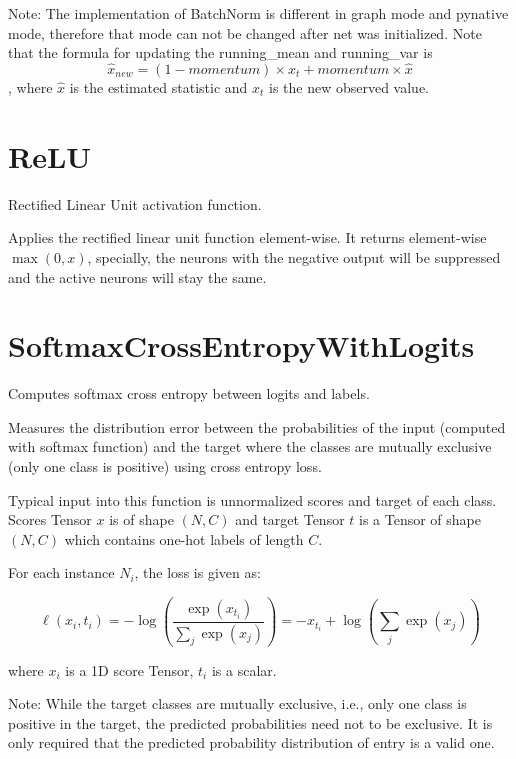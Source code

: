 \documentclass{article}
\begin{document}
    Note:
    The implementation of BatchNorm is different in graph mode and pynative mode, therefore that mode can not be
    changed after net was initialized.
    Note that the formula for updating the running\_mean and running\_var is
    $$\hat{x}_ {new} = (1 - momentum) \times x_t + momentum \times \hat{x}$$,
    where $\hat{x}$ is the estimated statistic and $x_t$ is the new observed value.


    \section{ReLU}
    Rectified Linear Unit activation function.

    Applies the rectified linear unit function element-wise. It returns
    element-wise $\max(0, x)$, specially, the neurons with the negative output
    will be suppressed and the active neurons will stay the same.


    \section{SoftmaxCrossEntropyWithLogits}
    Computes softmax cross entropy between logits and labels.

    Measures the distribution error between the probabilities of the input (computed with softmax function) and the
    target where the classes are mutually exclusive (only one class is positive) using cross entropy loss.

    Typical input into this function is unnormalized scores and target of each class.
    Scores Tensor $x$ is of shape $(N, C)$ and target Tensor $t$ is a
    Tensor of shape $(N, C)$ which contains one-hot labels of length $C$.

    For each instance  $N_i$, the loss is given as:

    $$\ell(x_i, t_i) = - \log\left(\frac{\exp(x_{t_i})}{\sum_j \exp(x_j)}\right)
    =  -x_{t_i} + \log\left(\sum_j \exp(x_j)\right)$$

    where $x_i$ is a 1D score Tensor, $t_i$ is a scalar.

    Note:
    While the target classes are mutually exclusive, i.e., only one class is positive in the target, the predicted
    probabilities need not to be exclusive. It is only required that the predicted probability distribution
    of entry is a valid one.
\end{document}
